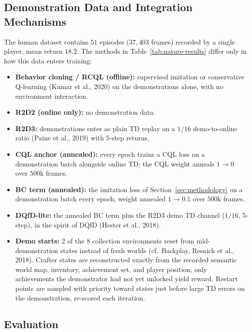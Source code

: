 \subsection{Demonstration Data and Integration Mechanisms}

The human dataset contains $51$ episodes ($37{,}403$ frames) recorded by a
single player, mean return $18.2$. The methods in
Table~\ref{tab:nature-results} differ only in how this data enters
training:

\begin{itemize}
  \item \textbf{Behavior cloning / RCQL (offline):} supervised imitation or
  conservative Q-learning (Kumar et al., 2020) on the demonstrations alone,
  with no environment interaction.
  \item \textbf{R2D2 (online only):} no demonstration data.
  \item \textbf{R2D3:} demonstrations enter as plain TD replay on a
  $1/16$ demo-to-online ratio (Paine et al., 2019) with $5$-step returns.
  \item \textbf{CQL anchor (annealed):} every epoch trains a CQL loss on a
  demonstration batch alongside online TD; the CQL weight anneals
  $1 \rightarrow 0$ over $500$k frames.
  \item \textbf{BC term (annealed):} the imitation loss of
  Section~\ref{sec:methodology} on a demonstration batch every epoch,
  weight annealed $1 \rightarrow 0.1$ over $500$k frames.
  \item \textbf{DQfD-lite:} the annealed BC term plus the R2D3 demo TD
  channel ($1/16$, $5$-step), in the spirit of DQfD (Hester et al., 2018).
  \item \textbf{Demo starts:} $2$ of the $8$ collection environments reset
  from mid-demonstration states instead of fresh worlds (cf.\ Backplay,
  Resnick et al., 2018). Crafter states are reconstructed exactly from the
  recorded semantic world map, inventory, achievement set, and player
  position; only achievements the demonstrator had not yet unlocked yield
  reward. Restart points are sampled with priority toward states just
  before large TD errors on the demonstration, re-scored each iteration.
\end{itemize}

\subsection{Evaluation}

